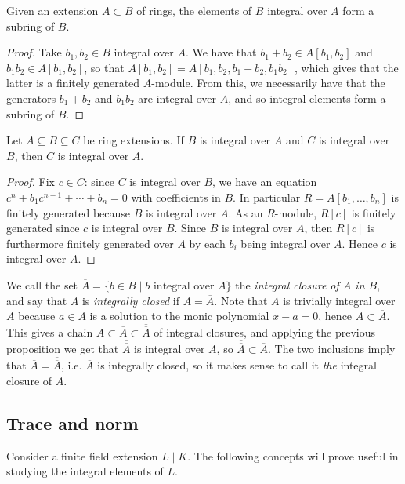 \begin{cor}
	Given an extension $A\subset B$ of rings, the elements of $B$ integral over $A$ form a subring of $B$.
\end{cor}
\begin{proof}
	Take $b_1,b_2\in B$ integral over $A$. We have that $b_1+b_2\in A[b_1,b_2]$ and $b_1b_2\in A[b_1,b_2]$, so that $A[b_1,b_2]=A[b_1,b_2,b_1+b_2,b_1b_2]$, which gives that the latter is a finitely generated $A$-module. From this, we necessarily have that the generators $b_1+b_2$ and $b_1b_2$ are integral over $A$, and so integral elements form a subring of $B$.
\end{proof}

\begin{prop}[Neukirch 2.4]
	Let $A\subseteq B\subseteq C$ be ring extensions. If $B$ is integral over $A$ and $C$ is integral over $B$, then $C$ is integral over $A$.
\end{prop}
\begin{proof}
	Fix $c\in C$: since $C$ is integral over $B$, we have an equation $c^n+b_1c^{n-1}+\cdots+b_n=0$ with coefficients in $B$. In particular $R=A[b_1,\dots,b_n]$ is finitely generated because $B$ is integral over $A$. As an $R$-module, $R[c]$ is finitely generated since $c$ is integral over $B$. Since $B$ is integral over $A$, then $R[c]$ is furthermore finitely generated over $A$ by each $b_i$ being integral over $A$. Hence $c$ is integral over $A$.
\end{proof}

We call the set $\overline{A}=\{b\in B \mid b \text{ integral over } A\}$ the \emph{integral closure of $A$ in $B$}, and say that $A$ is \emph{integrally closed} if $A=\overline{A}$. Note that $A$ is trivially integral over $A$ because $a\in A$ is a solution to the monic polynomial $x-a=0$, hence $A\subset\overline{A}$. This gives a chain $A\subset \overline{A}\subset\overline{\overline{A}}$ of integral closures, and applying the previous proposition we get that $\overline{\overline{A}}$ is integral over $A$, so $\overline{\overline{A}}\subset\overline{A}$. The two inclusions imply that $\overline{A}=\overline{\overline{A}}$, i.e. $\overline{A}$ is integrally closed, so it makes sense to call it \emph{the} integral closure of $A$.


\subsection{Trace and norm}

Consider a finite field extension $L\mid K$. The following concepts will prove useful in studying the integral elements of $L$.

